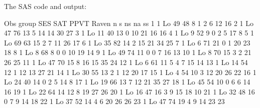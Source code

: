 \documentclass{article}
\begin{document}
The SAS code and output:
\begin{Woutput}
Obs    group    SES    SAT    PPVT    Raven     n     s    ns    na    ss
  1      1      Lo      49     48        8      1     2     6    12    16
  2      1      Lo      47     76       13      5    14    14    30    27
  3      1      Lo      11     40       13      0    10    21    16    16
  4      1      Lo       9     52        9      0     2     5    17     8
  5      1      Lo      69     63       15      2     7    11    26    17
  6      1      Lo      35     82       14      2    15    21    34    25
  7      1      Lo       6     71       21      0     1    20    23    18
  8      1      Lo       8     68        8      0     0    10    19    14
  9      1      Lo      49     74       11      0     0     7    16    13
 10      1      Lo       8     70       15      3     2    21    26    25
 11      1      Lo      47     70       15      8    16    15    35    24
 12      1      Lo       6     61       11      5     4     7    15    14
 13      1      Lo      14     54       12      1    12    13    27    21
 14      1      Lo      30     55       13      2     1    12    20    17
 15      1      Lo       4     54       10      3    12    20    26    22
 16      1      Lo      24     40       14      0     2     5    14     8
 17      1      Lo      19     66       13      7    12    21    35    27
 18      1      Lo      45     54       10      0     6     6    14    16
 19      1      Lo      22     64       14     12     8    19    27    26
 20      1      Lo      16     47       16      3     9    15    18    10
 21      1      Lo      32     48       16      0     7     9    14    18
 22      1      Lo      37     52       14      4     6    20    26    26
 23      1      Lo      47     74       19      4     9    14    23    23

\end{Woutput}
\end{document}
